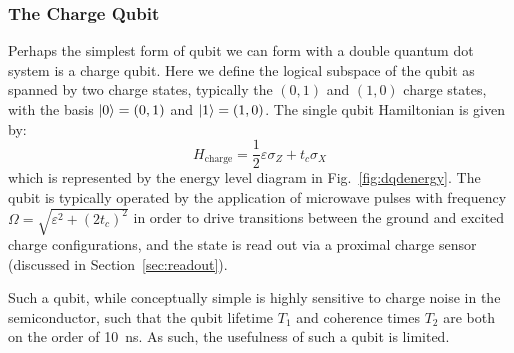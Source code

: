 \subsubsection{The Charge Qubit}
Perhaps the simplest form of qubit we can form with a double quantum dot system is a charge qubit. Here we define
the logical subspace of the qubit as spanned by two charge states, typically the $(0, 1)$ and $(1, 0)$ charge states,
with the basis $\ket{0} = (0, 1)$ and $\ket{1} = (1, 0)$. The single qubit Hamiltonian is given by:
\begin{equation}
  H_{\textrm{charge}} = \frac{1}{2}\varepsilon\sigma_Z + t_c\sigma_X
\end{equation}
which is represented by the energy level diagram in Fig.~\ref{fig:dqdenergy}. The qubit is typically operated by the application
of microwave pulses with frequency $\Omega = \sqrt{\varepsilon^2 + (2 t_c)^2}$ in order to drive transitions between the ground and
excited charge configurations, and the state is read out via a proximal charge sensor (discussed in Section~\ref{sec:readout}).

Such a qubit, while conceptually simple is highly sensitive to charge noise in the semiconductor, such that the qubit lifetime $T_1$ and
coherence times $T_2$ are both on the order of \SI{10}{\nano\second}\cite{PhysRevLett.105.246804}. As such, the usefulness of such a qubit
is limited.

